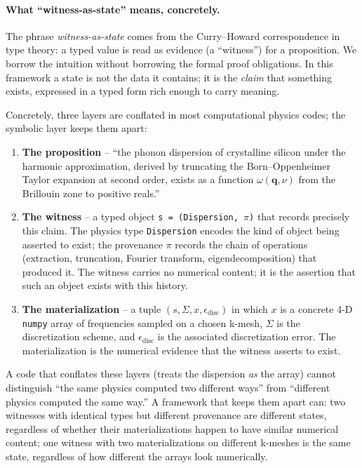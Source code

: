 \documentclass[11pt,a4paper]{article}
\begin{document}
\paragraph{What ``witness-as-state'' means, concretely.}

The phrase \emph{witness-as-state} comes from the Curry--Howard correspondence in type theory:
a typed value is read as evidence (a ``witness'') for a proposition. We borrow the intuition
without borrowing the formal proof obligations. In this framework a state is not the data it
contains; it is the \emph{claim} that something exists, expressed in a typed form rich enough
to carry meaning.

Concretely, three layers are conflated in most computational physics codes; the symbolic layer keeps
them apart:

\begin{enumerate}[leftmargin=2em]
  \item \textbf{The proposition} -- ``the phonon dispersion of crystalline silicon under the
        harmonic approximation, derived by truncating the Born--Oppenheimer Taylor expansion at
        second order, exists as a function $\omega(\mathbf{q}, \nu)$ from the Brillouin zone to
        positive reals.''
  \item \textbf{The witness} -- a typed object \texttt{s = (Dispersion, $\pi$)} that records
        precisely this claim. The physics type \texttt{Dispersion} encodes the kind of object
        being asserted to exist; the provenance $\pi$ records the chain of operations
        (extraction, truncation, Fourier transform, eigendecomposition) that produced it. The
        witness carries no numerical content; it is the assertion that such an object exists
        with this history.
  \item \textbf{The materialization} -- a tuple $(s, \Sigma, x, \epsilon_{\text{disc}})$ in
        which $x$ is a concrete 4-D \texttt{numpy} array of frequencies sampled on a chosen
        k-mesh, $\Sigma$ is the discretization scheme, and $\epsilon_{\text{disc}}$ is the
        associated discretization error. The materialization is the numerical evidence that the
        witness asserts to exist.
\end{enumerate}

A code that conflates these layers (treats the dispersion \emph{as} the array) cannot
distinguish ``the same physics computed two different ways'' from ``different physics computed
the same way.'' A framework that keeps them apart can: two witnesses with identical types but
different provenance are different states, regardless of whether their materializations happen
to have similar numerical content; one witness with two materializations on different k-meshes
is the same state, regardless of how different the arrays look numerically.
\end{document}
